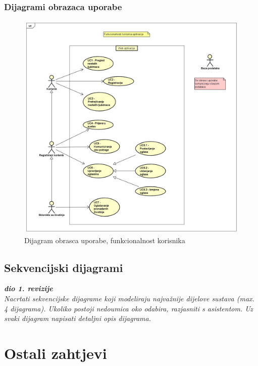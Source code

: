 				
					
				\pagebreak
				\subsubsection{Dijagrami obrazaca uporabe}
				
					\begin{figure}[htb]
						\centering
						\includegraphics[width=\textwidth]{slike/funkcionalnosti_korisnika.png}
						\caption{Dijagram obrasca uporabe, funkcionalnost korisnika}
					\end{figure}		
				
			\pagebreak
			\subsection{Sekvencijski dijagrami}
				
				\textbf{\textit{dio 1. revizije}}\\
				
				\textit{Nacrtati sekvencijske dijagrame koji modeliraju najvažnije dijelove sustava (max. 4 dijagrama). Ukoliko postoji nedoumica oko odabira, razjasniti s asistentom. Uz svaki dijagram napisati detaljni opis dijagrama.}
				\eject
	
		\section{Ostali zahtjevi}
		
